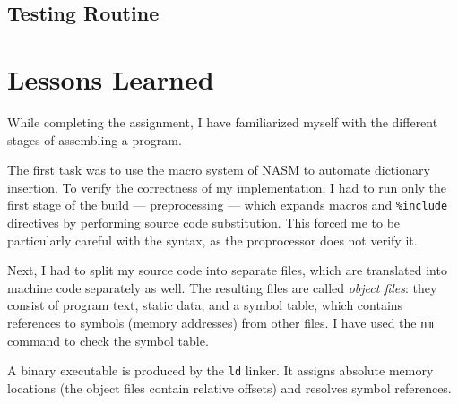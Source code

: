 \documentclass[en, listings]{labreport}
\begin{document}
\subsection*{Testing Routine}



\section*{Lessons Learned}

While completing the assignment, I have familiarized myself with the different
stages of assembling a program.

The first task was to use the macro system of NASM to automate dictionary insertion.
To verify the correctness of my implementation, I had to run only the first stage of
the build — preprocessing — which expands macros and \texttt{\%include} directives by
performing source code substitution. This forced me to be particularly careful
with the syntax, as the proprocessor does not verify it.

Next, I had to split my source code into separate files, which are translated
into machine code separately as well. The resulting files are called \textit{object files}:
they consist of program text, static data, and a symbol table, which contains
references to symbols (memory addresses) from other files. I have used the \texttt{nm}
command to check the symbol table.

A binary executable is produced by the \texttt{ld} linker. It assigns absolute memory
locations (the object files contain relative offsets) and resolves symbol references.
\end{document}
